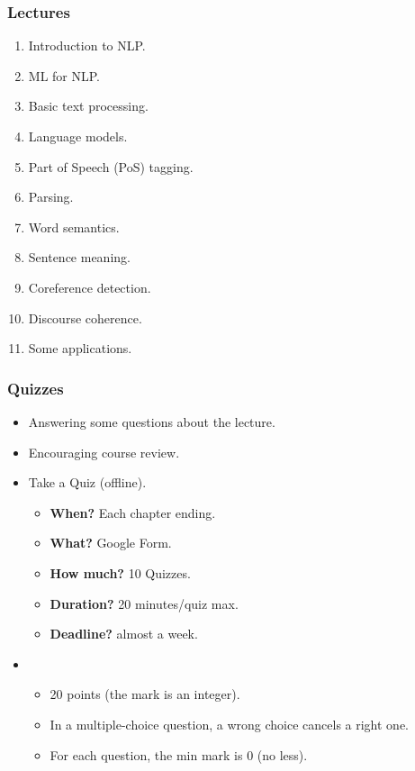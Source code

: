 \documentclass{beamer}
\begin{document}
\begin{frame}
\frametitle{Lectures}

\begin{enumerate}
	\item Introduction to NLP.
	\item ML for NLP.
	\item Basic text processing.
	\item Language models.
	\item Part of Speech (PoS) tagging.
	\item Parsing.
	\item Word semantics.
	\item Sentence meaning.
	\item Coreference detection.
	\item Discourse coherence.
	\item Some applications.
\end{enumerate}

\end{frame}

\begin{frame}
	\frametitle{Quizzes}
	
	\begin{itemize}
		\item Answering some questions about the lecture.
		\item {} Encouraging course review.
		\item {} Take a Quiz (offline).
		\begin{itemize}
			\item \textbf{When?} Each chapter ending.
			\item \textbf{What?} Google Form.
			\item \textbf{How much?} 10 Quizzes.
			\item \textbf{Duration?} 20 minutes/quiz max.
			\item \textbf{Deadline?} almost a week.
		\end{itemize}
		\item {}
		\begin{itemize}
			\item 20 points (the mark is an integer).
			\item In a multiple-choice question, a wrong choice cancels a right one.
			\item For each question, the min mark is 0 (no less).
		\end{itemize}
	\end{itemize}
	
\end{frame}
\end{document}
